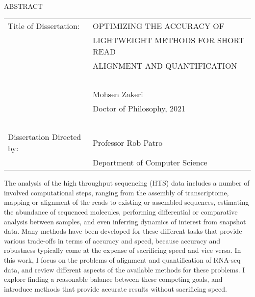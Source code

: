 
\hbox{\ }

\renewcommand{\baselinestretch}{1}
\small \normalsize

\begin{center}
\large{{ABSTRACT}}

\vspace{3em}

\end{center}
\hspace{-.15in}
\begin{tabular}{ll}
Title of Dissertation:    & {\large  OPTIMIZING THE ACCURACY OF }\\
&                     {\large  LIGHTWEIGHT METHODS FOR SHORT READ} \\
&                     {\large  ALIGNMENT AND QUANTIFICATION} \\
\ \\
&                          {\large  Mohsen Zakeri} \\
&                           {\large Doctor of Philosophy, 2021} \\
\ \\
Dissertation Directed by: & {\large  Professor Rob Patro} \\
&               {\large  Department of Computer Science } \\
\end{tabular}

\vspace{3em}

\renewcommand{\baselinestretch}{2}
\large \normalsize

The analysis of the high throughput sequencing (HTS) data includes a number 
of involved computational steps, ranging from the assembly of transcriptome, 
mapping or alignment of the reads to existing or assembled 
sequences, estimating the abundance of sequenced molecules, performing 
differential or comparative analysis between samples, and even inferring 
dynamics of interest from snapshot data. Many methods have been developed 
for these different tasks that provide various trade-offs in terms of 
accuracy and speed, because accuracy and robustness typically come at the 
expense of sacrificing speed and vice versa. In this work, I focus on the 
problems of alignment and quantification of RNA-seq data, and review 
different aspects of the available methods for these problems. I explore 
finding a reasonable balance between these competing goals, and introduce 
methods that provide accurate results without sacrificing speed.

